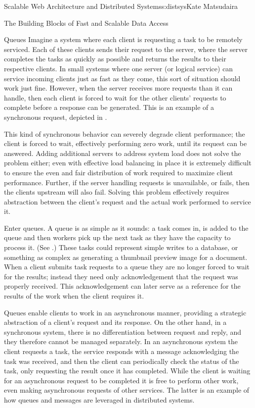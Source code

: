 \begin{aosachapter}{Scalable Web Architecture and Distributed Systems}{s:distsys}{Kate Matsudaira}
\begin{aosasect1}{The Building Blocks of Fast and Scalable Data Access}
\begin{aosasect2}{Queues}
Imagine a system where each client is requesting a task to be remotely
serviced. Each of these clients sends their request to the server,
where the server completes the tasks as quickly as possible and
returns the results to their respective clients. In small systems
where one server (or logical service) can service incoming clients
just as fast as they come, this sort of situation should work just
fine. However, when the server receives more requests than it can
handle, then each client is forced to wait for the other clients'
requests to complete before a response can be generated. This is an
example of a synchronous request, depicted in .


This kind of synchronous behavior can severely degrade client
performance; the client is forced to wait, effectively performing zero
work, until its request can be answered. Adding additional servers to
address system load does not solve the problem either; even with
effective load balancing in place it is extremely difficult to ensure
the even and fair distribution of work required to maximize client
performance. Further, if the server handling requests is unavailable,
or fails, then the clients upstream will also fail. Solving this
problem effectively requires abstraction between the client's request
and the actual work performed to service it.

Enter queues. A queue is as simple as it sounds: a task comes in, is
added to the queue and then workers pick up the next task as they have
the capacity to process it. (See .) These tasks 
could represent simple writes to a
database, or something as complex as generating a thumbnail preview
image for a document. When a client submits task requests to a queue
they are no longer forced to wait for the results; instead they need
only acknowledgement that the request was properly received. This
acknowledgement can later serve as a reference for the results of the
work when the client requires it.

Queues enable clients to work in an asynchronous manner, providing a
strategic abstraction of a client's request and its response. On the
other hand, in a synchronous system, there is no differentiation
between request and reply, and they therefore cannot be managed
separately. In an asynchronous system the client requests a task, the
service responds with a message acknowledging the task was received,
and then the client can periodically check the status of the task,
only requesting the result once it has completed. While the client is
waiting for an asynchronous request to be completed it is free to
perform other work, even making asynchronous requests of other
services. The latter is an example of how queues and messages are
leveraged in distributed systems.


\end{aosasect2}
\end{aosasect1}
\end{aosachapter}
